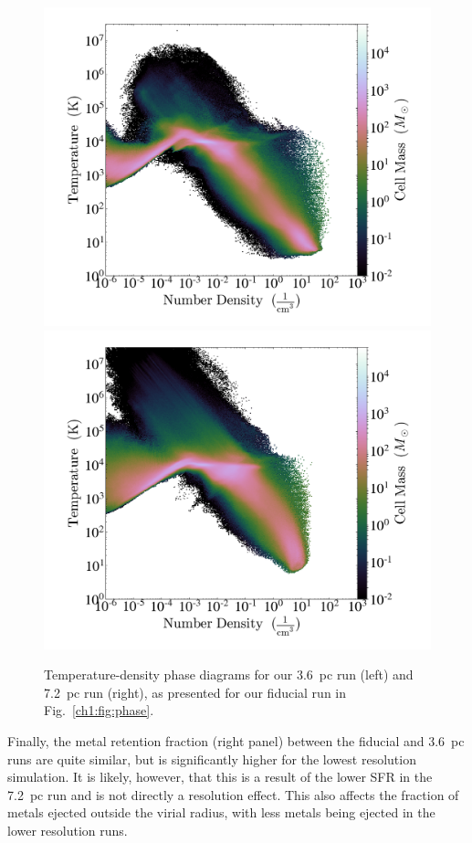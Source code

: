 \begin{figure}
\centering
\includegraphics[width=0.75\linewidth]{figures/ch1/3pc_phase.png}\\
\includegraphics[width=0.75\linewidth]{figures/ch1/6pc_phase.png}
\caption{Temperature-density phase diagrams for our 3.6~pc run (left) and 7.2~pc run (right), as presented for our fiducial run in Fig.~\ref{ch1:fig:phase}.}
\label{ch1:fig:phase_resolution}
\end{figure}

Finally, the metal retention fraction (right panel) between the fiducial and 3.6~pc runs are quite similar, but is significantly higher for the lowest resolution simulation. It is likely, however, that this is a result of the lower SFR in the 7.2~pc run and is not directly a resolution effect. This also affects the fraction of metals ejected outside the virial radius, with less metals being ejected in the lower resolution runs.



\renewcommand\thesection{\thechapter.\arabic{section}}
